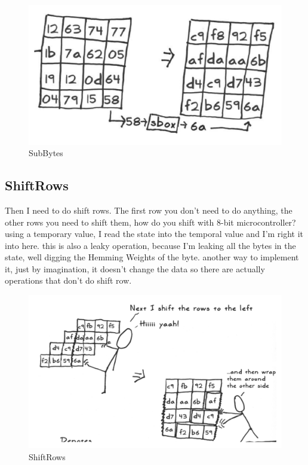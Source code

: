 \begin{figure}[htp]
\centering
\includegraphics[scale=0.2]{images/Lecture_5/Subbytes.png}
\caption{SubBytes}\label{fig:SubBytes}
\end{figure}

\subsection{ShiftRows}

Then I need to do shift rows. The first row you don't need to do anything, the other rows you need to shift them, how do you shift with 8-bit microcontroller? using a temporary value, I read the state into the temporal value and I'm right it into here. this is also a leaky operation, because I'm leaking all the bytes in the state, well digging the Hemming Weights of the byte. another way to implement it, just by imagination, it doesn't change the data so there are actually operations that don't do shift row.

\begin{figure}[htp]
\centering
\includegraphics[scale=0.2]{images/Lecture_5/shiftrows.png}
\caption{ShiftRows}\label{fig:ShiftRows}
\end{figure}

